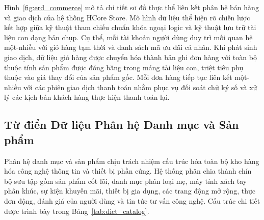 Hình~\ref{fig:erd_commerce} mô tả chi tiết sơ đồ thực thể liên kết phân hệ bán hàng và giao dịch của hệ thống HCore Store. Mô hình dữ liệu thể hiện rõ chiến lược kết hợp giữa kỹ thuật tham chiếu chuẩn khóa ngoại logic và kỹ thuật lưu trữ tài liệu con dạng bản chụp. Cụ thể, mỗi tài khoản người dùng duy trì mối quan hệ một-nhiều với giỏ hàng tạm thời và danh sách mã ưu đãi cá nhân. Khi phát sinh giao dịch, dữ liệu giỏ hàng được chuyển hóa thành bản ghi đơn hàng với toàn bộ thuộc tính sản phẩm được đóng băng trong mảng tài liệu con, triệt tiêu phụ thuộc vào giá thay đổi của sản phẩm gốc. Mỗi đơn hàng tiếp tục liên kết một-nhiều với các phiên giao dịch thanh toán nhằm phục vụ đối soát chữ ký số và xử lý các kịch bản khách hàng thực hiện thanh toán lại.

\subsection{Từ điển Dữ liệu Phân hệ Danh mục và Sản phẩm}
Phân hệ danh mục và sản phẩm chịu trách nhiệm cấu trúc hóa toàn bộ kho hàng hóa công nghệ thông tin và thiết bị phần cứng. Hệ thống phân chia thành chín bộ sưu tập gồm sản phẩm cốt lõi, danh mục phân loại mẹ, máy tính xách tay phân khúc, sự kiện khuyến mãi, thiết bị gia dụng, các trang động mở rộng, thực đơn động, đánh giá của người dùng và tin tức tư vấn công nghệ. Cấu trúc chi tiết được trình bày trong Bảng~\ref{tab:dict_catalog}.

